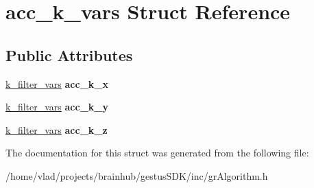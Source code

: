 \hypertarget{structacc__k__vars}{}\section{acc\+\_\+k\+\_\+vars Struct Reference}
\label{structacc__k__vars}
\subsection*{Public Attributes}
\begin{DoxyCompactItemize}
\item 
\mbox{\label{structacc__k__vars_a8520459b0302db23887ae66a172d803e}} 
\mbox{\hyperlink{structk__filter__vars}{k\+\_\+filter\+\_\+vars}} {\bfseries acc\+\_\+k\+\_\+x}
\item 
\mbox{\label{structacc__k__vars_a2e819b3166338fe86a3ef7c3ab7f0636}} 
\mbox{\hyperlink{structk__filter__vars}{k\+\_\+filter\+\_\+vars}} {\bfseries acc\+\_\+k\+\_\+y}
\item 
\mbox{\label{structacc__k__vars_aa10974f1bd2776c2ffc0a577e88e213f}} 
\mbox{\hyperlink{structk__filter__vars}{k\+\_\+filter\+\_\+vars}} {\bfseries acc\+\_\+k\+\_\+z}
\end{DoxyCompactItemize}


The documentation for this struct was generated from the following file\+:\begin{DoxyCompactItemize}
\item 
/home/vlad/projects/brainhub/gestus\+S\+D\+K/inc/gr\+Algorithm.\+h\end{DoxyCompactItemize}
